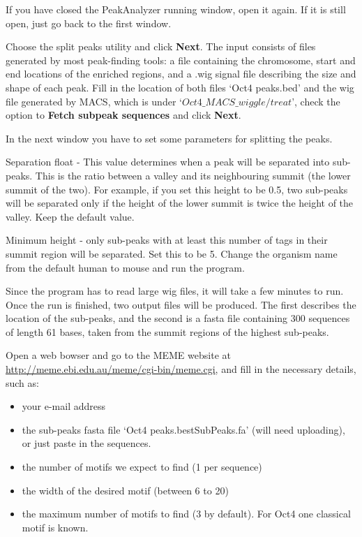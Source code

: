 \begin{steps}
If you have closed the PeakAnalyzer running window, open it again. If it is still open, just go back to the first window. 

Choose the split peaks utility and click \textbf{Next}. The input consists of files generated by most peak-finding tools: a file containing the chromosome, start and end locations of the enriched regions, and a .wig signal file describing the size and shape of each peak. Fill in the location of both files `Oct4 peaks.bed' and the wig file generated by MACS, which is under `$Oct4\_MACS\_wiggle/treat$', check the option to \textbf{Fetch subpeak sequences} and click \textbf{Next}.

In the next window you have to set some parameters for splitting the peaks. 

Separation float - This value determines when a peak will be separated into sub-peaks. This is the ratio between a valley and its neighbouring summit (the lower summit of the two). For example, if you set this height to be 0.5, two sub-peaks will be separated only if the height of the lower summit is twice the height of the valley. Keep the default value. 

Minimum height - only sub-peaks with at least this number of tags in their summit region will be separated. Set this to be 5. Change the organism name from the default human to mouse and run the program. 
\end{steps}

\begin{information}
Since the program has to read large wig files, it will take a few minutes to run. Once the run is finished, two output files will be produced. The first describes the location of the sub-peaks, and the second is a fasta file containing 300 sequences of length 61 bases, taken from the summit regions of the highest sub-peaks. 
\end{information}

\begin{steps}
Open a web bowser and go to the MEME website at \url{http://meme.ebi.edu.au/meme/cgi-bin/meme.cgi}, and fill in the necessary details, such as: 
\begin{itemize}
	\item your e-mail address 
	\item the sub-peaks fasta file `Oct4 peaks.bestSubPeaks.fa' (will need uploading), or just paste in the sequences. 
	\item the number of motifs we expect to find (1 per sequence) 
	\item the width of the desired motif (between 6 to 20) 
	\item the maximum number of motifs to find (3 by default). For Oct4 one classical motif is known. 
\end{itemize}
\end{steps}

